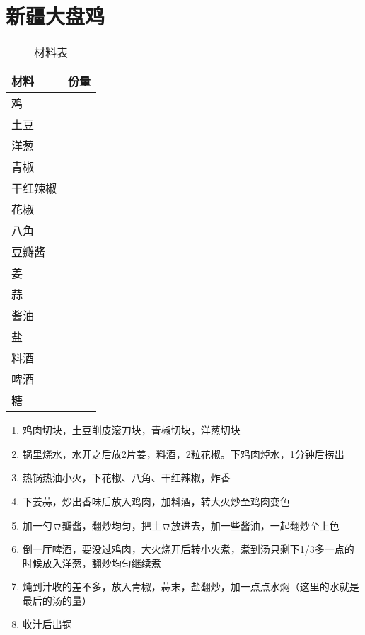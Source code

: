 \section{新疆大盘鸡}

\begin{table}[H]
    \centering
    \begin{tabular}{|l||c|}\hline
     \textbf{材料}    &  \textbf{份量}\\ \hline\hline
    鸡   &   \\ \hline
    土豆    &   \\ \hline
    洋葱 &  \\ \hline 
    青椒 & \\ \hline
    干红辣椒 &  \\ \hline
    花椒 & \\ \hline 
    八角 & \\ \hline 
    豆瓣酱 & \\ \hline 
    姜 & \\ \hline 
    蒜& \\ \hline 
    酱油 & \\ \hline 
    盐 & \\ \hline 
    料酒 & \\ \hline 
    啤酒 & \\ \hline 
    糖 & \\ \hline 
    \end{tabular}
    \caption{材料表}
\end{table}

\begin{enumerate}
    \item 鸡肉切块，土豆削皮滚刀块，青椒切块，洋葱切块
    \item 锅里烧水，水开之后放2片姜，料酒，2粒花椒。下鸡肉焯水，1分钟后捞出
    \item 热锅热油小火，下花椒、八角、干红辣椒，炸香
    \item 下姜蒜，炒出香味后放入鸡肉，加料酒，转大火炒至鸡肉变色
    \item 加一勺豆瓣酱，翻炒均匀，把土豆放进去，加一些酱油，一起翻炒至上色
    \item 倒一厅啤酒，要没过鸡肉，大火烧开后转小火煮，煮到汤只剩下1/3多一点的时候放入洋葱，翻炒均匀继续煮
    \item 炖到汁收的差不多，放入青椒，蒜末，盐翻炒，加一点点水焖（这里的水就是最后的汤的量）
    \item 收汁后出锅
\end{enumerate}






